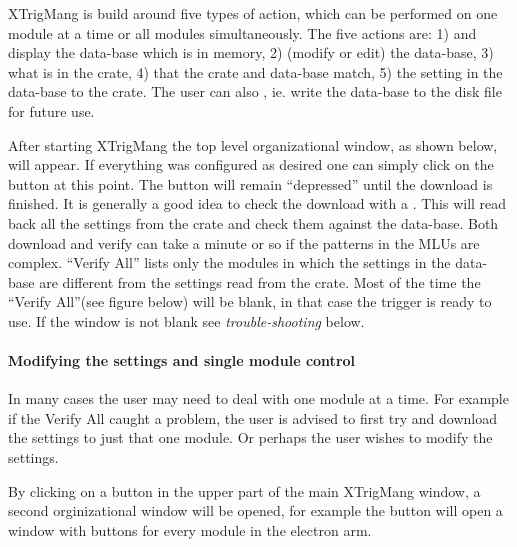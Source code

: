 	XTrigMang is build around five types of action,  which can be performed on one module at a time or all modules simultaneously.  The five actions are: 1)  and display the data-base which is in memory, 2)  (modify or edit) the data-base, 3)  what is in the crate, 4)  that the crate and data-base match, 5)  the setting in the data-base to the crate. The user can also , ie. write the data-base to the disk file for future use.

	After starting XTrigMang the top level organizational window,  as shown below, will appear.  If everything was configured as desired one can simply click on the  button at this point.  The button will remain ``depressed'' until the download is finished.  It is generally a good idea to check the download with a .  This will read back all the settings from the crate and check them against the data-base.  Both download and verify can take a minute or so if the patterns in the MLUs are complex. ``Verify All'' lists only the modules in which the settings in the data-base are different from the settings read from the crate. Most of the time the ``Verify All''(see figure below) will be blank, in that case the trigger is ready to use.  If the window is not blank see {\sl trouble-shooting} below.


	
\paragraph{Modifying the settings and single module control}

	In many cases the user may need to deal with one module at a time.  For example if the Verify All caught a problem,  the user is advised to first try and download the settings to just that one module.  Or perhaps the user wishes to modify the settings.  

	By clicking on a button in the upper part of the main XTrigMang window,  a second orginizational window will be opened,  for example the  button will open a window with buttons for every module in the electron arm.
	
